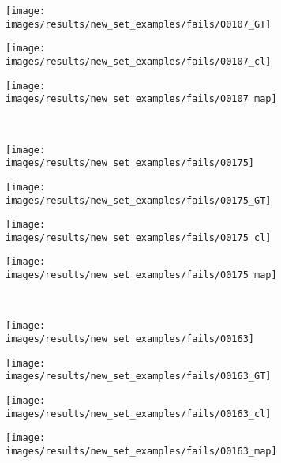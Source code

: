 \begin{figure}[t]
\begin{subfigure}[c]{0.24\textwidth}
 \end{subfigure}
 \begin{subfigure}[c]{0.24\textwidth}
  \centering
  \texttt{[image: images/results/new\_set\_examples/fails/00107\_GT]}
 \end{subfigure}
 \begin{subfigure}[c]{0.24\textwidth}
  \centering
  \texttt{[image: images/results/new\_set\_examples/fails/00107\_cl]}
 \end{subfigure}
 \begin{subfigure}[c]{0.24\textwidth}
  \centering
  \texttt{[image: images/results/new\_set\_examples/fails/00107\_map]}
 \end{subfigure}
 \\
 \begin{subfigure}[c]{0.24\textwidth}
  \centering
  \texttt{[image: images/results/new\_set\_examples/fails/00175]}
 \end{subfigure}
 \begin{subfigure}[c]{0.24\textwidth}
  \centering
  \texttt{[image: images/results/new\_set\_examples/fails/00175\_GT]}
 \end{subfigure}
 \begin{subfigure}[c]{0.24\textwidth}
  \centering
  \texttt{[image: images/results/new\_set\_examples/fails/00175\_cl]}
 \end{subfigure}
 \begin{subfigure}[c]{0.24\textwidth}
  \centering
  \texttt{[image: images/results/new\_set\_examples/fails/00175\_map]}
 \end{subfigure}
 \\
 \begin{subfigure}[c]{0.24\textwidth}
  \centering
  \texttt{[image: images/results/new\_set\_examples/fails/00163]}
 \end{subfigure}
 \begin{subfigure}[c]{0.24\textwidth}
  \centering
  \texttt{[image: images/results/new\_set\_examples/fails/00163\_GT]}
 \end{subfigure}
 \begin{subfigure}[c]{0.24\textwidth}
  \centering
  \texttt{[image: images/results/new\_set\_examples/fails/00163\_cl]}
 \end{subfigure}
 \begin{subfigure}[c]{0.24\textwidth}
  \centering
  \texttt{[image: images/results/new\_set\_examples/fails/00163\_map]}

\end{subfigure}
\end{figure}
